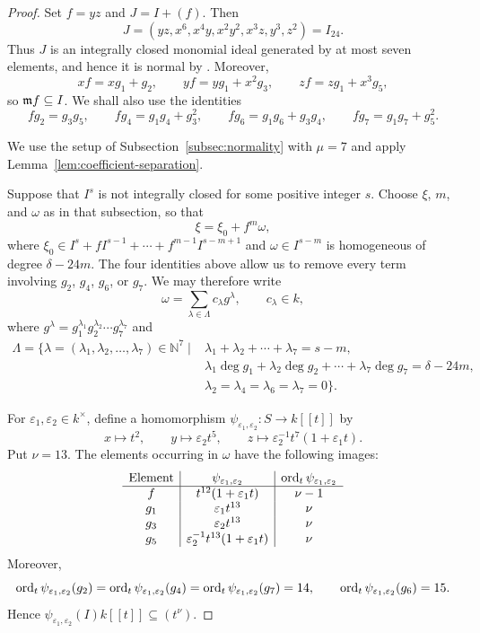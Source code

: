 \begin{proof}
Set $f=yz$ and $J=I+(f)$.  Then
$$
 J=(yz,x^6,x^4y,x^2y^2,x^3z,y^3,z^2)=I_{24}.
$$
Thus $J$ is an integrally closed monomial ideal generated by at most seven
elements, and hence it is normal by \cite{AtakaMatsuoka2026}.  Moreover,
$$
 xf=xg_1+g_2,\qquad
 yf=yg_1+x^2g_3,\qquad
 zf=zg_1+x^3g_5,
$$
so $\mathfrak m f\subseteq I$.  We shall also use the identities
$$
 fg_2=g_3g_5,\qquad
 fg_4=g_1g_4+g_3^2,\qquad
 fg_6=g_1g_6+g_3g_4,\qquad
 fg_7=g_1g_7+g_5^2.
$$

We use the setup of Subsection~\ref{subsec:normality} with $\mu=7$
and apply Lemma~\ref{lem:coefficient-separation}.

Suppose that $I^s$ is not integrally closed for some positive integer $s$.
Choose $\xi$, $m$, and $\omega$ as in that subsection, so that
$$
 \xi=\xi_0+f^m\omega,
$$
where
$\xi_0\in I^s+fI^{s-1}+\cdots+f^{m-1}I^{s-m+1}$ and
$\omega\in I^{s-m}$ is homogeneous of degree $\delta-24m$.
The four identities above allow us to remove every term involving
$g_2$, $g_4$, $g_6$, or $g_7$.  We may therefore write
$$
 \omega=\sum_{\lambda\in\Lambda}c_\lambda g^\lambda,
 \qquad c_\lambda\in k,
$$
where $g^\lambda=g_1^{\lambda_1}g_2^{\lambda_2}\cdots g_7^{\lambda_7}$ and
$$
\begin{aligned}
 \Lambda=\{\lambda=(\lambda_1,\lambda_2,\ldots,\lambda_7)\in\mathbb N^7
 \mid {}&\lambda_1+\lambda_2+\cdots+\lambda_7=s-m,\\
 &\lambda_1\deg g_1+\lambda_2\deg g_2+\cdots+\lambda_7\deg g_7
       =\delta-24m,\\
 &\lambda_2=\lambda_4=\lambda_6=\lambda_7=0\}.
\end{aligned}
$$

For $\varepsilon_1,\varepsilon_2\in k^\times$, define a homomorphism
$\psi_{\varepsilon_1,\varepsilon_2}\colon S\to k[[t]]$ by
$$
 x\longmapsto t^2,\qquad
 y\longmapsto\varepsilon_2t^5,\qquad
 z\longmapsto\varepsilon_2^{-1}t^7(1+\varepsilon_1t).
$$
Put $\nu=13$.  The elements occurring in $\omega$ have the following
images:
\[
\begin{array}{c|c|c}
 \text{Element}&\psi_{\varepsilon_1,\varepsilon_2}&
 \operatorname{ord}_t\psi_{\varepsilon_1,\varepsilon_2}\\ \hline
 f&t^{12}(1+\varepsilon_1t)&\nu-1\\
 g_1&\varepsilon_1t^{13}&\nu\\
 g_3&\varepsilon_2t^{13}&\nu\\
 g_5&\varepsilon_2^{-1}t^{13}(1+\varepsilon_1t)&\nu
\end{array}
\]
Moreover,
$$
 \operatorname{ord}_t\psi_{\varepsilon_1,\varepsilon_2}(g_2)
 =\operatorname{ord}_t\psi_{\varepsilon_1,\varepsilon_2}(g_4)
 =\operatorname{ord}_t\psi_{\varepsilon_1,\varepsilon_2}(g_7)=14,
 \qquad \operatorname{ord}_t\psi_{\varepsilon_1,\varepsilon_2}(g_6)=15.
$$
Hence
$\psi_{\varepsilon_1,\varepsilon_2}(I)k[[t]]\subseteq(t^\nu)$.


\end{proof}
